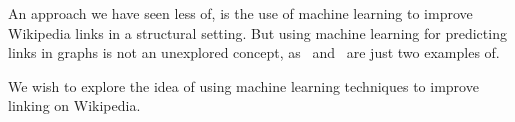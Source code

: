 An approach we have seen less of, is the use of machine learning to improve Wikipedia links in a structural setting. But using machine learning for predicting links in graphs is not an unexplored concept, as~\cite{tang2015line} and~\cite{al2006link} are just two examples of.

We wish to explore the idea of using machine learning techniques to improve linking on Wikipedia.


